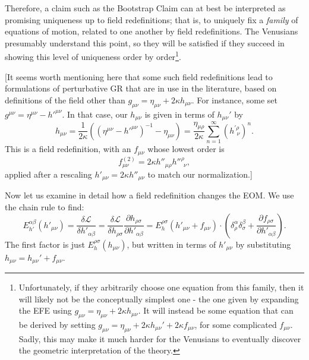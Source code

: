 \documentclass[aps,physrev,preprint,groupedaddress]{revtex4-2}
\begin{document}
Therefore, a claim such as the Bootstrap Claim can at best be interpreted as promising uniqueness up to field redefinitions; that is, to uniquely fix a \textit{family} of equations of motion, related to one another by field redefinitions. The Venusians presumably understand this point, so they will be satisfied if they succeed in showing this level of uniqueness order by order\footnote{Unfortunately, if they arbitrarily choose one equation from this family, then it will likely not be the conceptually simplest one - the one given by expanding the EFE using \(g_{\mu\nu} = \eta_{\mu\nu} + 2\kappa h_{\mu\nu}\). It will instead be some equation that can be derived by setting \(g_{\mu\nu} = \eta_{\mu\nu} + 2\kappa h_{\mu\nu}'+2\kappa f_{\mu\nu}\), for some complicated \(f_{\mu\nu}\). Sadly, this may make it much harder for the Venusians to eventually discover the geometric interpretation of the theory.}.

[It seems worth mentioning here that some such field redefinitions lead to formulations of perturbative GR that are in use in the literature, based on definitions of the field other than \(g_{\mu\nu} = \eta_{\mu\nu} + 2\kappa h_{\mu\nu}\). For instance, some set \cite{Butcher} \(g^{\mu\nu} = \eta^{\mu\nu} -  h'^{\mu\nu}\). In that case, our \(h_{\mu\nu}\) is given in terms of \(h_{\mu\nu}'\) by
\begin{equation} 
h_{\mu\nu}=\frac{1}{2\kappa}\left({\left(\eta^{\mu\nu} -  h'^{\mu\nu}\right)}^{-1}-\eta_{\mu\nu}\right)=\frac{\eta_{\mu\rho}}{2\kappa}\sum_{n=1}^\infty {\left(h_{\ \ \nu}^{\prime\rho}\right)}^n.
\end{equation}
This is a field redefinition, with an \(f_{\mu\nu}\) whose lowest order is
\begin{equation}
    f_{\mu\nu}^{(2)}= 2\kappa h''_{\mu\rho}h''^{\rho}_{\ \ \nu},
\end{equation}
applied after a rescaling \(h'_{\mu\nu}=2\kappa h''_{\mu\nu}\) to match our normalization.]

Now let us examine in detail how a field redefinition changes the EOM. We use the chain rule to find:
\begin{equation}
E_{h'}^{\alpha\beta}(h'_{\mu\nu})=\frac{\delta\mathcal{L}}{\delta h'_{\alpha\beta}}=\frac{\delta\mathcal{L}}{\delta h_{\rho\sigma}}\frac{\partial h_{\rho\sigma}}{\partial h'_{\alpha\beta}}=E_h^{\rho\sigma}(h'_{\mu\nu}+f_{\mu\nu})\cdot\left(\delta_\rho^\alpha\delta_\sigma^\beta+\frac{\partial f_{\rho\sigma}}{\partial h'_{\alpha\beta}}\right).
\end{equation}
The first factor is just \(E_h^{\rho\sigma}(h_{\mu\nu})\), but written in terms of \(h'_{\mu\nu}\) by substituting \(h_{\mu\nu}=h_{\mu\nu}'+f_{\mu\nu}\). 
\end{document}
